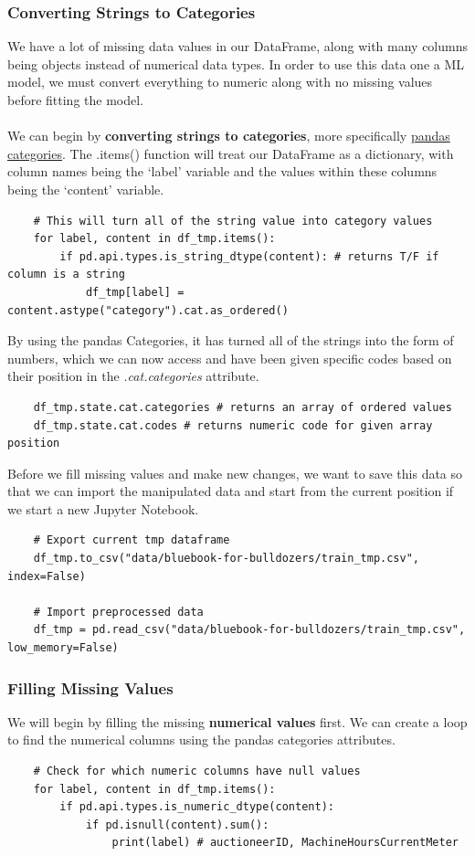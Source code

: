 \documentclass[11pt, a4paper]{article}
\begin{document}
\begin{spacing}{1.1}
	\subsubsection{Converting Strings to Categories}
	We have a lot of missing data values in our DataFrame, along with many columns being objects instead of numerical data types. In order to use this data one a ML model, we must convert everything to numeric along with no missing values before fitting the model. \\~\\
	We can begin by \textbf{converting strings to categories}, more specifically \href{https://pandas.pydata.org/pandas-docs/stable/reference/general_utility_functions.html#data-types-related-functionality}{pandas categories}. The .items() function will treat our DataFrame as a dictionary, with column names being the `label' variable and the values within these columns being the `content' variable.
	\begin{lstlisting}
	# This will turn all of the string value into category values
	for label, content in df_tmp.items():
		if pd.api.types.is_string_dtype(content): # returns T/F if column is a string
			df_tmp[label] = content.astype("category").cat.as_ordered()	\end{lstlisting} \vspace*{1mm}
	By using the pandas Categories, it has turned all of the strings into the form of numbers, which we can now access and have been given specific codes based on their position in the \textit{.cat.categories} attribute. 
	\begin{lstlisting}
	df_tmp.state.cat.categories # returns an array of ordered values
	df_tmp.state.cat.codes # returns numeric code for given array position \end{lstlisting} \newpage

	\noindent Before we fill missing values and make new changes, we want to save this data so that we can import the manipulated data and start from the current position if we start a new Jupyter Notebook.
	\begin{lstlisting}
	# Export current tmp dataframe
	df_tmp.to_csv("data/bluebook-for-bulldozers/train_tmp.csv", index=False)
	
	# Import preprocessed data
	df_tmp = pd.read_csv("data/bluebook-for-bulldozers/train_tmp.csv", low_memory=False)\end{lstlisting} \vspace*{1mm}	
	\subsubsection{Filling Missing Values}
	We will begin by filling the missing \textbf{numerical values} first. We can create a loop to find the numerical columns using the pandas categories attributes.
	\begin{lstlisting}	
	# Check for which numeric columns have null values
	for label, content in df_tmp.items():
		if pd.api.types.is_numeric_dtype(content):
			if pd.isnull(content).sum():
				print(label) # auctioneerID, MachineHoursCurrentMeter
	

\end{lstlisting}
\end{spacing}
\end{document}
